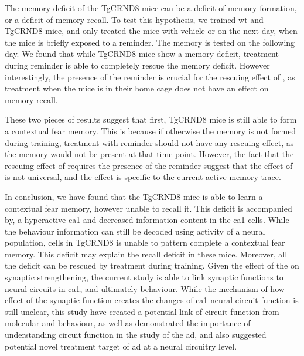 The memory deficit of the TgCRND8 mice can be a deficit of memory formation, or a deficit of memory recall. To test this hypothesis, we trained \gls{wt} and TgCRND8 mice, and only treated the mice with vehicle or \tglu{} on the next day, when the mice is briefly exposed to a reminder. The memory is tested on the following day. We found that while TgCRND8 mice show a memory deficit, \tglu{} treatment during reminder is able to completely rescue the memory deficit. However interestingly, the presence of the reminder is crucial for the rescuing effect of \tglu, as \tglu{} treatment when the mice is in their home cage does not have an effect on memory recall. 

These two pieces of results suggest that first, TgCRND8 mice is still able to form a contextual fear memory. This is because if otherwise the memory is not formed during training, \tglu{} treatment with reminder should not have any rescuing effect, as the memory would not be present at that time point. However, the fact that the rescuing effect of \tglu{} requires the presence of the reminder suggest that the effect of \tglu{} is not universal, and the effect is specific to the current active memory trace. 

In conclusion, we have found that the TgCRND8 mice is able to learn a contextual fear memory, however unable to recall it. This deficit is accompanied by, a hyperactive \gls{ca1} and decreased information content in the \gls{ca1} cells. While the behaviour information can still be decoded using activity of a neural population, cells in TgCRND8 is unable to pattern complete a contextual fear memory. This deficit may explain the recall deficit in these mice. Moreover, all the deficit can be rescued by \tglu{} treatment during training. Given the effect of the \tglu{} on synaptic strengthening, the current study is able to link synaptic functions to neural circuits in \gls{ca1}, and ultimately behaviour. While the mechanism of how effect of the synaptic function creates the changes of \gls{ca1} neural circuit function is still unclear, this study have created a potential link of circuit function from molecular and behaviour, as well as demonstrated the importance of understanding circuit function in the study of the \gls{ad}, and also suggested potential novel treatment target of \gls{ad} at a neural circuitry level. 

